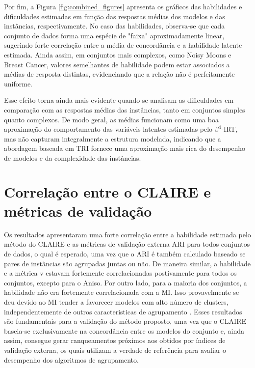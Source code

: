 Por fim, a Figura \ref{fig:combined_figures} apresenta os gráficos das habilidades e dificuldades estimadas em função das respostas médias dos modelos e das instâncias, respectivamente. No caso das habilidades, observa-se que cada conjunto de dados forma uma espécie de "faixa" aproximadamente linear, sugerindo forte correlação entre a média de concordância e a habilidade latente estimada. Ainda assim, em conjuntos mais complexos, como Noisy Moons e Breast Cancer, valores semelhantes de habilidade podem estar associados a médias de resposta distintas, evidenciando que a relação não é perfeitamente uniforme.

Esse efeito torna ainda mais evidente quando se analisam as dificuldades em comparação com as respostas médias das instâncias, tanto em conjuntos simples quanto complexos. De modo geral, as médias funcionam como uma boa aproximação do comportamento das variáveis latentes estimadas pelo $\beta^{4}$-\gls{IRT}, mas não capturam integralmente a estrutura modelada, indicando que a abordagem baseada em \gls{TRI} fornece uma aproximação mais rica do desempenho de modelos e da complexidade das instâncias.


\section{Correlação entre o \gls{CLAIRE} e métricas de validação}

Os resultados apresentaram uma forte correlação entre a  habilidade estimada pelo método do \gls{CLAIRE} e as métricas de validação externa \gls{ARI} para todos conjuntos de dados, o qual é esperado, uma vez que o \gls{ARI} é também calculado baseado se pares de instâncias são agrupadas juntas ou não. De maneira similar, a habilidade e a métrica \gls{v} estavam fortemente correlacionadas postivamente para todos os conjuntos, excepto para o Aniso. Por outro lado, para a maioria dos conjuntos, a habilidade não era fortemente correlacionada com a \gls{MI}. Isso provavelmente se deu devido ao \gls{MI} tender a favorecer modelos com alto número de clusters, independentemente de outros caracteristicas de agrupamento \cite{gates2017impact}. Esses resultados são fundamentais para a validação do método proposto, uma vez que o \gls{CLAIRE} baseia-se exclusivamente na concordância entre os modelos do conjunto e, ainda assim, consegue gerar ranqueamentos próximos aos obtidos por índices de validação externa, os quais utilizam a verdade de referência para avaliar o desempenho dos algoritmos de agrupamento.

